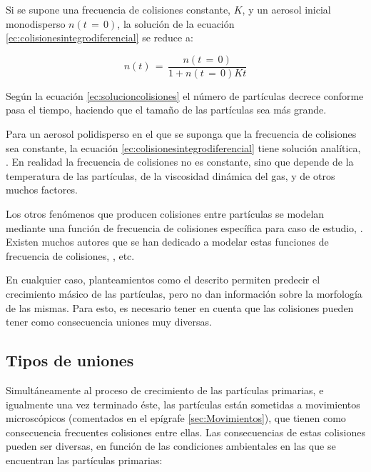 Si se supone una frecuencia de colisiones constante, $K$, y un aerosol inicial monodisperso $n(t\,=\,0)$, la solución de la ecuación \ref{ec:colisionesintegrodiferencial} se reduce a:

\begin{equation}
\label{ec:solucioncolisiones}
n(t)\,=\, \dfrac{n(t\,=\,0)}{1+n(t\,=\,0)Kt}
\end{equation}

\par Según la ecuación \ref{ec:solucioncolisiones} el número de partículas decrece conforme pasa el tiempo, haciendo que el tamaño de las partículas sea más grande.

\par Para un aerosol polidisperso en el que se suponga que la frecuencia de colisiones sea constante, la ecuación \ref{ec:colisionesintegrodiferencial} tiene solución analítica, \cite{fuchs:1989}. En realidad la frecuencia de colisiones no es constante, sino que depende de la temperatura de las partículas, de la viscosidad dinámica del gas, y de otros muchos factores.

\par Los otros fenómenos que producen colisiones entre partículas se modelan mediante una función de frecuencia de colisiones específica para caso de estudio, \cite{friedlander:2000}. Existen muchos autores que se han dedicado a modelar estas funciones de frecuencia de colisiones, \cite{kazakovetal:1998,kimetal:2001,kostoglouetal:2001}, etc.

\par En cualquier caso, planteamientos como el descrito permiten predecir el crecimiento másico de las partículas, pero no dan información sobre la morfología de las mismas. Para esto, es necesario tener en cuenta que las colisiones pueden tener como consecuencia uniones muy diversas.

\subsection{Tipos de uniones}

\par Simultáneamente al proceso de crecimiento de las partículas primarias, e igualmente una vez terminado éste, las partículas están sometidas a movimientos microscópicos (comentados en el epígrafe \ref{sec:Movimientos}), que tienen como consecuencia frecuentes colisiones entre ellas. Las consecuencias de estas colisiones pueden ser diversas, en función de las condiciones ambientales en las que se encuentran las partículas primarias:

